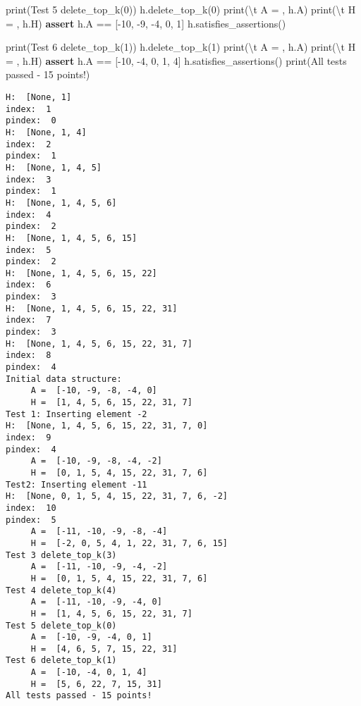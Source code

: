 \documentclass[
]{article}
\newenvironment{Shaded}{}{}
\newcommand{\BuiltInTok}[1]{\textcolor[rgb]{0.00,0.50,0.00}{#1}}
\newcommand{\CharTok}[1]{\textcolor[rgb]{0.25,0.44,0.63}{#1}}
\newcommand{\ControlFlowTok}[1]{\textcolor[rgb]{0.00,0.44,0.13}{\textbf{#1}}}
\newcommand{\DecValTok}[1]{\textcolor[rgb]{0.25,0.63,0.44}{#1}}
\newcommand{\NormalTok}[1]{#1}
\newcommand{\OperatorTok}[1]{\textcolor[rgb]{0.40,0.40,0.40}{#1}}
\newcommand{\StringTok}[1]{\textcolor[rgb]{0.25,0.44,0.63}{#1}}
\begin{document}
\begin{Shaded}
\begin{Highlighting}[]
\BuiltInTok{print}\NormalTok{(}\StringTok{\textquotesingle{}Test 5 delete\_top\_k(0)\textquotesingle{}}\NormalTok{)}
\NormalTok{h.delete\_top\_k(}\DecValTok{0}\NormalTok{)}
\BuiltInTok{print}\NormalTok{(}\StringTok{\textquotesingle{}}\CharTok{\textbackslash{}t}\StringTok{ A = \textquotesingle{}}\NormalTok{, h.A)}
\BuiltInTok{print}\NormalTok{(}\StringTok{\textquotesingle{}}\CharTok{\textbackslash{}t}\StringTok{ H = \textquotesingle{}}\NormalTok{, h.H)}
\ControlFlowTok{assert}\NormalTok{ h.A }\OperatorTok{==}\NormalTok{ [}\OperatorTok{{-}}\DecValTok{10}\NormalTok{, }\OperatorTok{{-}}\DecValTok{9}\NormalTok{, }\OperatorTok{{-}}\DecValTok{4}\NormalTok{, }\DecValTok{0}\NormalTok{, }\DecValTok{1}\NormalTok{]}
\NormalTok{h.satisfies\_assertions()}

\BuiltInTok{print}\NormalTok{(}\StringTok{\textquotesingle{}Test 6 delete\_top\_k(1)\textquotesingle{}}\NormalTok{)}
\NormalTok{h.delete\_top\_k(}\DecValTok{1}\NormalTok{)}
\BuiltInTok{print}\NormalTok{(}\StringTok{\textquotesingle{}}\CharTok{\textbackslash{}t}\StringTok{ A = \textquotesingle{}}\NormalTok{, h.A)}
\BuiltInTok{print}\NormalTok{(}\StringTok{\textquotesingle{}}\CharTok{\textbackslash{}t}\StringTok{ H = \textquotesingle{}}\NormalTok{, h.H)}
\ControlFlowTok{assert}\NormalTok{ h.A }\OperatorTok{==}\NormalTok{ [}\OperatorTok{{-}}\DecValTok{10}\NormalTok{, }\OperatorTok{{-}}\DecValTok{4}\NormalTok{, }\DecValTok{0}\NormalTok{, }\DecValTok{1}\NormalTok{, }\DecValTok{4}\NormalTok{]}
\NormalTok{h.satisfies\_assertions()}
\BuiltInTok{print}\NormalTok{(}\StringTok{\textquotesingle{}All tests passed {-} 15 points!\textquotesingle{}}\NormalTok{)}
\end{Highlighting}
\end{Shaded}

\begin{verbatim}
H:  [None, 1]
index:  1
pindex:  0
H:  [None, 1, 4]
index:  2
pindex:  1
H:  [None, 1, 4, 5]
index:  3
pindex:  1
H:  [None, 1, 4, 5, 6]
index:  4
pindex:  2
H:  [None, 1, 4, 5, 6, 15]
index:  5
pindex:  2
H:  [None, 1, 4, 5, 6, 15, 22]
index:  6
pindex:  3
H:  [None, 1, 4, 5, 6, 15, 22, 31]
index:  7
pindex:  3
H:  [None, 1, 4, 5, 6, 15, 22, 31, 7]
index:  8
pindex:  4
Initial data structure: 
	 A =  [-10, -9, -8, -4, 0]
	 H =  [1, 4, 5, 6, 15, 22, 31, 7]
Test 1: Inserting element -2
H:  [None, 1, 4, 5, 6, 15, 22, 31, 7, 0]
index:  9
pindex:  4
	 A =  [-10, -9, -8, -4, -2]
	 H =  [0, 1, 5, 4, 15, 22, 31, 7, 6]
Test2: Inserting element -11
H:  [None, 0, 1, 5, 4, 15, 22, 31, 7, 6, -2]
index:  10
pindex:  5
	 A =  [-11, -10, -9, -8, -4]
	 H =  [-2, 0, 5, 4, 1, 22, 31, 7, 6, 15]
Test 3 delete_top_k(3)
	 A =  [-11, -10, -9, -4, -2]
	 H =  [0, 1, 5, 4, 15, 22, 31, 7, 6]
Test 4 delete_top_k(4)
	 A =  [-11, -10, -9, -4, 0]
	 H =  [1, 4, 5, 6, 15, 22, 31, 7]
Test 5 delete_top_k(0)
	 A =  [-10, -9, -4, 0, 1]
	 H =  [4, 6, 5, 7, 15, 22, 31]
Test 6 delete_top_k(1)
	 A =  [-10, -4, 0, 1, 4]
	 H =  [5, 6, 22, 7, 15, 31]
All tests passed - 15 points!
\end{verbatim}
\end{document}
